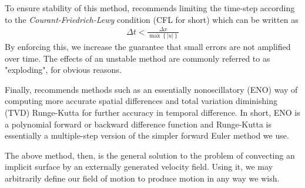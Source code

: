 To ensure stability of this method,  recommends limiting the time-step according to the \emph{Courant-Friedrich-Lewy} condition (CFL for short) which can be written as
\begin{eqnarray}
\Delta t < \frac{\Delta x}{\max \left\lbrace \left| u \right| \right\rbrace}
\end{eqnarray}
By enforcing this, we increase the guarantee that small errors are not amplified over time. The effects of an unstable method are commonly referred to as "exploding", for obvious reasons.

Finally,  recommends methods such as an essentially nonoscillatory (ENO) way of computing more accurate spatial differences and total variation diminishing (TVD) Runge-Kutta for further accuracy in temporal difference. In short, ENO is a polynomial forward or backward difference function and Runge-Kutta is essentially a multiple-step version of the simpler forward Euler method we use.

The above method, then, is the general solution to the problem of convecting an implicit surface by an externally generated velocity field. Using it, we may arbitrarily define our field of motion to produce motion in any way we wish.


